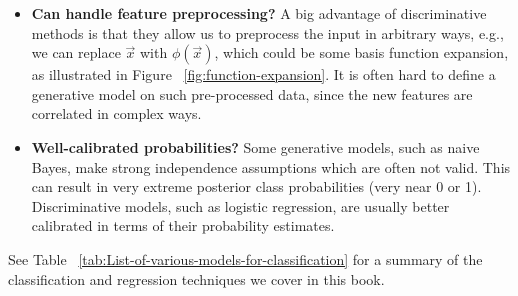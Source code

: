 \begin{itemize}
\item{\textbf{Can handle feature preprocessing?} A big advantage of discriminative methods is that they allow us to preprocess the input in arbitrary ways, e.g., we can replace $\vec{x}$ with $\phi(\vec{x})$, which could be some basis function expansion, as illustrated in Figure ~\ref{fig:function-expansion}. It is often hard to define a generative model on such pre-processed data, since the new features are correlated in complex ways.}

\item{\textbf{Well-calibrated probabilities?} Some generative models, such as naive Bayes, make strong independence assumptions which are often not valid. This can result in very extreme posterior class probabilities (very near 0 or 1). Discriminative models, such as logistic regression, are usually better calibrated in terms of their probability estimates.}
\end{itemize}

See Table ~\ref{tab:List-of-various-models-for-classification} for a summary of the classification and regression techniques we cover in this book.

